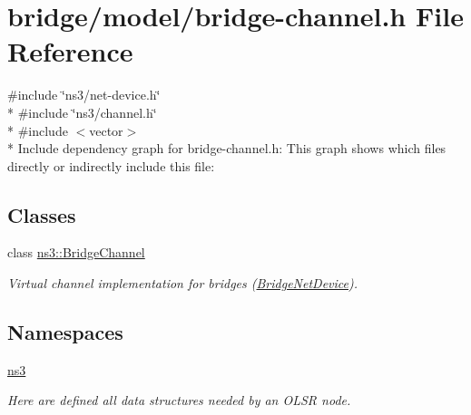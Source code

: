 \hypertarget{bridge-channel_8h}{}\section{bridge/model/bridge-\/channel.h File Reference}
\label{bridge-channel_8h}
{\ttfamily \#include \char`\"{}ns3/net-\/device.\+h\char`\"{}}\\*
{\ttfamily \#include \char`\"{}ns3/channel.\+h\char`\"{}}\\*
{\ttfamily \#include $<$vector$>$}\\*
Include dependency graph for bridge-\/channel.h\+:
This graph shows which files directly or indirectly include this file\+:
\subsection*{Classes}
\begin{DoxyCompactItemize}
\item 
class \hyperlink{classns3_1_1BridgeChannel}{ns3\+::\+Bridge\+Channel}
\begin{DoxyCompactList}\small\item\em Virtual channel implementation for bridges (\hyperlink{classns3_1_1BridgeNetDevice}{Bridge\+Net\+Device}). \end{DoxyCompactList}\end{DoxyCompactItemize}
\subsection*{Namespaces}
\begin{DoxyCompactItemize}
\item 
 \hyperlink{namespacens3}{ns3}
\begin{DoxyCompactList}\small\item\em Here are defined all data structures needed by an O\+L\+SR node. \end{DoxyCompactList}\end{DoxyCompactItemize}
